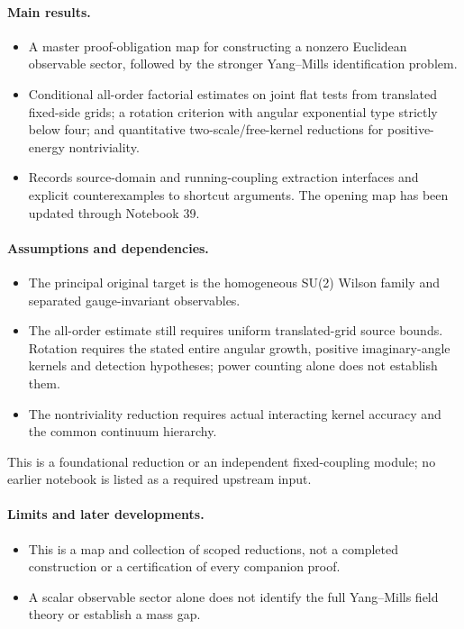 \paragraph{Main results.}
\begin{itemize}
\item A master proof-obligation map for constructing a nonzero Euclidean observable sector, followed by the stronger Yang--Mills identification problem.
\item Conditional all-order factorial estimates on joint flat tests from translated fixed-side grids; a rotation criterion with angular exponential type strictly below four; and quantitative two-scale/free-kernel reductions for positive-energy nontriviality.
\item Records source-domain and running-coupling extraction interfaces and explicit counterexamples to shortcut arguments. The opening map has been updated through Notebook 39.
\end{itemize}

\paragraph{Assumptions and dependencies.}
\begin{itemize}
\item The principal original target is the homogeneous SU(2) Wilson family and separated gauge-invariant observables.
\item The all-order estimate still requires uniform translated-grid source bounds. Rotation requires the stated entire angular growth, positive imaginary-angle kernels and detection hypotheses; power counting alone does not establish them.
\item The nontriviality reduction requires actual interacting kernel accuracy and the common continuum hierarchy.
\end{itemize}

This is a foundational reduction or an independent fixed-coupling module; no earlier notebook is listed as a required upstream input.\par

\paragraph{Limits and later developments.}
\begin{itemize}
\item This is a map and collection of scoped reductions, not a completed construction or a certification of every companion proof.
\item A scalar observable sector alone does not identify the full Yang--Mills field theory or establish a mass gap.
\end{itemize}

